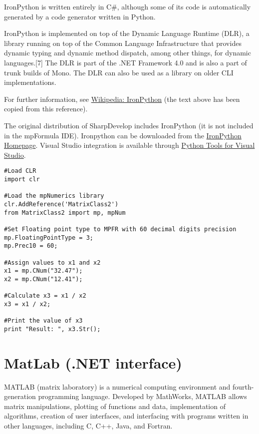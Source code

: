 IronPython is written entirely in C\#, although some of its code is automatically generated by a code generator written in Python.

IronPython is implemented on top of the Dynamic Language Runtime (DLR), a library running on top of the Common Language Infrastructure that provides dynamic typing and dynamic method dispatch, among other things, for dynamic languages.[7] The DLR is part of the .NET Framework 4.0 and is also a part of trunk builds of Mono. The DLR can also be used as a library on older CLI implementations.

For further information, see \href{http://en.wikipedia.org/wiki/IronPython}{Wikipedia: IronPython} (the text above has been copied from this reference).

The original distribution of SharpDevelop includes IronPython (it is not included in the mpFormula IDE). Ironpython can be downloaded from the 
\href{http://ironpython.net/}{IronPython Homepage}. Visual Studio integration is available through  \href{http://ironpython.net/tools/}{Python Tools for Visual Studio}.


\begin{lstlisting}
#Load CLR
import clr

#Load the mpNumerics library
clr.AddReference('MatrixClass2')
from MatrixClass2 import mp, mpNum

#Set Floating point type to MPFR with 60 decimal digits precision
mp.FloatingPointType = 3;
mp.Prec10 = 60;

#Assign values to x1 and x2
x1 = mp.CNum("32.47");
x2 = mp.CNum("12.41");

#Calculate x3 = x1 / x2
x3 = x1 / x2;

#Print the value of x3
print "Result: ", x3.Str();
\end{lstlisting}



	
	
	
	
	\newpage
	\section{MatLab (.NET interface)}
	\label{MatLabNET}
	
	MATLAB (matrix laboratory) is a numerical computing environment and fourth-generation programming language. Developed by MathWorks, MATLAB allows matrix manipulations, plotting of functions and data, implementation of algorithms, creation of user interfaces, and interfacing with programs written in other languages, including C, C++, Java, and Fortran.
	

